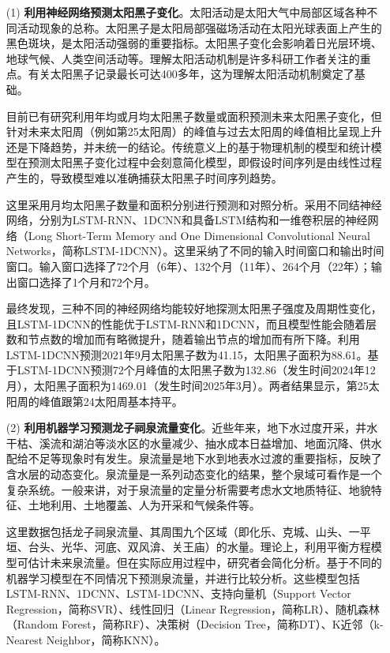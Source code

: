 \begin{enumerate}

  \item[(1)] \textbf{利用神经网络预测太阳黑子变化}。太阳活动是太阳大气中局部区域各种不同活动现象的总称。太阳黑子是太阳局部强磁场活动在太阳光球表面上产生的黑色斑块，是太阳活动强弱的重要指标。太阳黑子变化会影响着日光层环境、地球气候、人类空间活动等。理解太阳活动机制是许多科研工作者关注的重点。有关太阳黑子记录最长可达400多年，这为理解太阳活动机制奠定了基础。

  目前已有研究利用年均或月均太阳黑子数量或面积预测未来太阳黑子变化，但针对未来太阳周（例如第25太阳周）的峰值与过去太阳周的峰值相比呈现上升还是下降趋势，并未统一的结论。传统意义上的基于物理机制的模型和统计模型在预测太阳黑子变化过程中会刻意简化模型，即假设时间序列是由线性过程产生的，导致模型难以准确捕获太阳黑子时间序列趋势。
  
  这里采用月均太阳黑子数量和面积分别进行预测和对照分析。采用不同结神经网络，分别为LSTM-RNN、1DCNN和具备LSTM结构和一维卷积层的神经网络（Long Short-Term Memory and One Dimensional Convolutional Neural Networks，简称LSTM-1DCNN）。这里采纳了不同的输入时间窗口和输出时间窗口。输入窗口选择了72个月（6年）、132个月（11年）、264个月（22年）；输出窗口选择了1个月和72个月。
  
  最终发现，三种不同的神经网络均能较好地探测太阳黑子强度及周期性变化，且LSTM-1DCNN的性能优于LSTM-RNN和1DCNN，而且模型性能会随着层数和节点数的增加而有略微提升，随着输出节点的增加而有所下降。利用LSTM-1DCNN预测2021年9月太阳黑子数为41.15，太阳黑子面积为88.61。基于LSTM-1DCNN预测72个月峰值的太阳黑子数为132.86（发生时间2024年12月），太阳黑子面积为1469.01（发生时间2025年3月）。两者结果显示，第25太阳周的峰值跟第24太阳周基本持平。

  \item[{(2)}] \textbf{利用机器学习预测龙子祠泉流量变化}。近些年来，地下水过度开采，井水干枯、溪流和湖泊等淡水区的水量减少、抽水成本日益增加、地面沉降、供水配给不足等现象时有发生。泉流量是地下水到地表水过渡的重要指标，反映了含水层的动态变化。泉流量是一系列动态变化的结果，整个泉域可看作是一个复杂系统。一般来讲，对于泉流量的定量分析需要考虑水文地质特征、地貌特征、土地利用、土地覆盖、人为开采和气候条件等。
  
  这里数据包括龙子祠泉流量、其周围九个区域（即化乐、克城、山头、一平垣、台头、光华、河底、双风渰、关王庙）的水量。理论上，利用平衡方程模型可估计未来泉流量。但在实际应用过程中，研究者会简化分析。基于不同的机器学习模型在不同情况下预测泉流量，并进行比较分析。这些模型包括LSTM-RNN、1DCNN、LSTM-1DCNN、支持向量机（Support Vector Regression，简称SVR）、线性回归（Linear Regression，简称LR）、随机森林（Random Forest，简称RF）、决策树（Decision Tree，简称DT）、K近邻（k-Nearest Neighbor，简称KNN）。
  

\end{enumerate}
